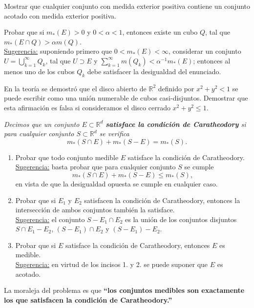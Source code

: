 \documentclass{book}
\newcommand{\rr}{\mathbb{R}}
\newcommand{\di}{\displaystyle}
\begin{document}
 \begin{ejer}{}
	Mostrar que cualquier conjunto con medida exterior positiva contiene un conjunto acotado con medida exterior positiva. 
	\end{ejer}
 
  \begin{ejer}{} 
	Probar que si $m_*(E)>0$ y $0<\alpha<1$, entonces existe un cubo $Q$, tal que
  $m_*(E\cap Q)>\alpha m(Q)$.
\\
  \underline{Sugerencia:} suponiendo primero que $0<m_*(E)<\infty$, considerar un conjunto
 $U=\di\bigcup_{k=1}^{\infty}Q_k$, tal que 
  $U\supset E$ y $\sum\limits_{k=1}^{\infty}m(Q_k)<\alpha^{-1} m_*(E)$; entonces al menos uno de los cubos $Q_k$
  debe satisfacer la desigualdad del enunciado.
 \end{ejer} 

\begin{ejer}{}
  En la teoría se demostró que el disco abierto  de $\rr^2$ definido por  $x^2+y^2< 1$ se puede escribir como una unión numerable de cubos casi-disjuntos. Demostrar que esta afirmación es falsa si consideramos el disco cerrado  $x^2+y^2\leq 1$.  
	\end{ejer}






  \begin{ejer} {} 
	{\it{Decimos que un conjunto $E\subset \rr^d$ 
  {\bf{satisface la condición de Caratheodory}}
  si para cualquier conjunto $S\subset \rr^d$ se verifica}} 
  $$m_*(S\cap E)+m_*(S-E)=m_*(S). $$
	\begin{enumerate}   
    \item Probar que todo conjunto medible $E$ satisface la condición de Caratheodory.
    \\
    \underline{Sugerencia:} basta probar que para cualquier conjunto $S$ se cumple
    $$m_*(S\cap E)+m_*(S-E)\leq m_*(S), $$
    en vista de que la desigualdad opuesta se cumple en cualquier caso.
 
    \item Probar que si $E_1$ y $E_2$ satisfacen la condición de Caratheodory, 
    entonces la intersección de ambos conjuntos también la satisface.
    \\
    \underline{Sugerencia:} el conjunto $S-E_1\cap E_2$ es la unión de los conjuntos 
    disjuntos $S\cap E_1-E_2$, $(S-E_1)\cap E_2$ y $(S-E_1)-E_2$.

    \item Probar que si $E$ satisface la condición de Caratheodory, entonces $E$ es medible.
    \\
    \underline{Sugerencia:} en virtud de los incisos  1. y  2. se puede suponer que $E$ es acotado.
	\end{enumerate}
    La moraleja del problema es que 
    {\bf{``los conjuntos medibles son exactamente los que satisfacen
    la condición de Caratheodory.''}}
  \end{ejer} 
	
\end{document}
